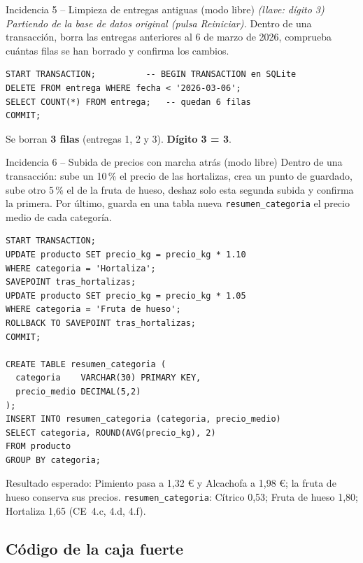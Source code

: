 \documentclass[11pt,a4paper]{article}
\begin{document}
\begin{reto}{Incidencia 5 -- Limpieza de entregas antiguas (modo libre) \emph{(llave: dígito 3)}}
\emph{Partiendo de la base de datos original (pulsa Reiniciar).} Dentro de una
transacción, borra las entregas anteriores al 6 de marzo de 2026, comprueba cuántas filas
se han borrado y confirma los cambios.
\end{reto}
\begin{solucion}
\begin{lstlisting}
START TRANSACTION;          -- BEGIN TRANSACTION en SQLite
DELETE FROM entrega WHERE fecha < '2026-03-06';
SELECT COUNT(*) FROM entrega;   -- quedan 6 filas
COMMIT;
\end{lstlisting}
Se borran \textbf{3 filas} (entregas 1, 2 y 3). \textbf{Dígito 3 = 3}.
\end{solucion}

\begin{reto}{Incidencia 6 -- Subida de precios con marcha atrás (modo libre)}
Dentro de una transacción: sube un 10\,\% el precio de las hortalizas, crea un punto de
guardado, sube otro 5\,\% el de la fruta de hueso, deshaz solo esta segunda subida y
confirma la primera. Por último, guarda en una tabla nueva \texttt{resumen\_categoria}
el precio medio de cada categoría.
\end{reto}
\begin{solucion}
\begin{lstlisting}
START TRANSACTION;
UPDATE producto SET precio_kg = precio_kg * 1.10
WHERE categoria = 'Hortaliza';
SAVEPOINT tras_hortalizas;
UPDATE producto SET precio_kg = precio_kg * 1.05
WHERE categoria = 'Fruta de hueso';
ROLLBACK TO SAVEPOINT tras_hortalizas;
COMMIT;

CREATE TABLE resumen_categoria (
  categoria    VARCHAR(30) PRIMARY KEY,
  precio_medio DECIMAL(5,2)
);
INSERT INTO resumen_categoria (categoria, precio_medio)
SELECT categoria, ROUND(AVG(precio_kg), 2)
FROM producto
GROUP BY categoria;
\end{lstlisting}
Resultado esperado: Pimiento pasa a 1,32 € y Alcachofa a 1,98 €; la fruta de hueso
conserva sus precios. \texttt{resumen\_categoria}: Cítrico 0,53; Fruta de hueso 1,80;
Hortaliza 1,65 (CE~4.c, 4.d, 4.f).
\end{solucion}

\subsection{Código de la caja fuerte}
\end{document}
